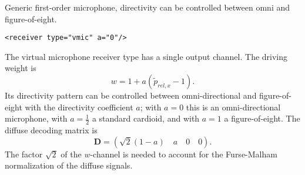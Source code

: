 Generic first-order microphone, directivity can be controlled between
omni and figure-of-eight.

\begin{lstlisting}[numbers=none]
<receiver type="vmic" a="0"/>
\end{lstlisting}

The virtual microphone receiver type has a single output channel. The
driving weight is
\begin{equation}
w = 1 + a (\tilde{p}_{rel,x} - 1).
\end{equation}
Its directivity pattern can be controlled between omni-directional and
figure-of-eight with the directivity coefficient $a$; with $a=0$ this
is an omni-directional microphone, with $a=\frac12$ a standard
cardioid, and with $a=1$ a figure-of-eight.
%
The diffuse decoding matrix is
\begin{equation}
\mathbf{D} = \left( \sqrt{2}(1-a) \quad a \quad 0\quad  0 \right).
\end{equation}
The factor \(\sqrt{2}\) of the \(w\)-channel is needed to account for
the Furse-Malham normalization of the diffuse signals.


